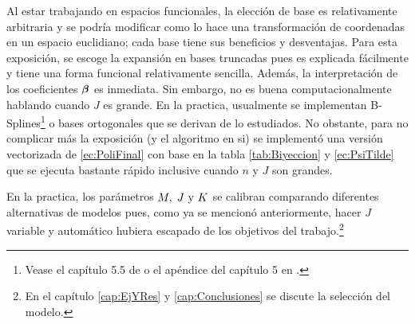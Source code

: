 \documentclass[../Main/Main.tex]{subfiles}
\begin{document}

Al estar trabajando en espacios funcionales, la elección de base es relativamente arbitraria y se podría modificar como lo hace una transformación de coordenadas en un espacio euclidiano; cada base tiene sus beneficios y desventajas. Para esta exposición, se escoge la expansión en bases truncadas pues es explicada fácilmente y tiene una forma funcional relativamente sencilla. Además, la interpretación de los coeficientes $\bm{\beta}$ es inmediata. Sin embargo, no es buena computacionalmente hablando cuando $J$ es grande. En la practica, usualmente se implementan B-Splines\footnote{Vease el capítulo 5.5 de \citet{wasserman2007all} o el apéndice del capítulo 5 en \citet{hastie2008elements}.} o bases ortogonales que se derivan de lo estudiados. No obstante, para no complicar más la exposición (y el algoritmo en si) se implementó una versión vectorizada de \eqref{ec:PoliFinal} con base en la tabla \ref{tab:Biyeccion} y \eqref{ec:PsiTilde} que se ejecuta bastante rápido inclusive cuando $n$ y $J$ son grandes.

En la practica, los parámetros $M,\;J\text{ y }K$ se calibran comparando diferentes alternativas de modelos pues, como ya se mencionó anteriormente, hacer $J$ variable y automático hubiera escapado de los objetivos del trabajo.\footnote{En el capítulo \ref{cap:EjYRes} y \ref{cap:Conclusiones} se discute la selección del modelo.}
\end{document}
